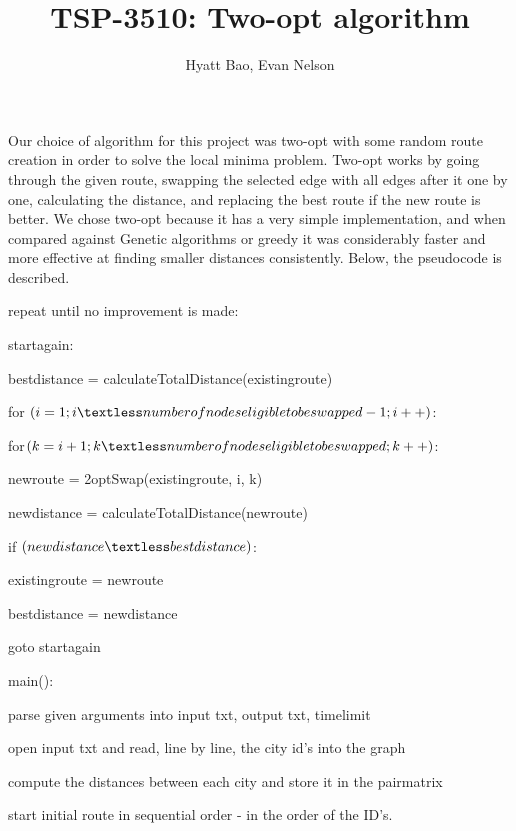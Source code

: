 \documentclass[11pt]{article}
\title{TSP-3510: Two-opt algorithm}
\author{Hyatt Bao, Evan Nelson}
\begin{document}
\maketitle
\thispagestyle{empty}
\pagestyle{empty}

\pagebreak
Our choice of algorithm for this project was two-opt with some random route creation in order to solve the local minima problem. Two-opt works by going through the given route, swapping the selected edge with all edges after it one by one, calculating the distance, and replacing the best route if the new route is better. We chose two-opt because it has a very simple implementation, and when compared against Genetic algorithms or greedy it was considerably faster and more effective at finding smaller distances consistently. Below, the pseudocode is described.



repeat until no improvement is made:

      \quad startagain:

      \quad bestdistance = calculateTotalDistance(existingroute)

      \quad  for $(i = 1; i \textless number of nodes eligible to be swapped - 1; i++)$:

           \quad \quad for$ (k = i + 1; k \textless number of nodes eligible to be swapped; k++)$:

              \quad \quad \quad newroute = 2optSwap(existingroute, i, k)

               \quad \quad \quad newdistance = calculateTotalDistance(newroute)

               \quad \quad \quad  if $(newdistance \textless bestdistance)$:

                   \quad \quad \quad \quad existingroute = newroute

                   \quad \quad \quad \quad bestdistance = newdistance

                   \quad \quad \quad \quad goto startagain


		\quad main():

			\quad \quad parse given arguments into input txt, output txt, timelimit

			\quad \quad open input txt and read, line by line, the city id's into the graph

			\quad \quad compute the distances between each city and store it in the pairmatrix

			\quad \quad start initial route in sequential order - in the order of the ID's.
\end{document}
